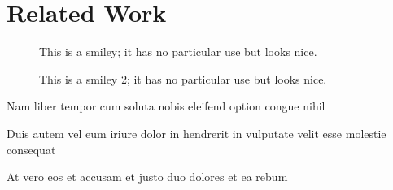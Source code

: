 \section{Related Work}
\label{sec:related_work}
\Blindtext


\begin{figure}[t]
	\centering
	\caption[This is a smiley]{This is a smiley; it has no particular use but looks nice. \blindtext}
	\label{fig:smiley}
\end{figure}

\begin{figure}[t]
	\centering
	\caption[This is a smiley 2]{This is a smiley 2; it has no particular use but looks nice.}
	\label{fig:smiley2}
\end{figure}

\Blindtext


\begin{description} \label{example:description}
	\item[Lorem:] Nam liber tempor cum soluta nobis eleifend option congue nihil 
	\item[Ipsum:] Duis autem vel eum iriure dolor in hendrerit in vulputate velit esse molestie consequat
	\item[Dolor:] At vero eos et accusam et justo duo dolores et ea rebum
\end{description}


\Blindtext
